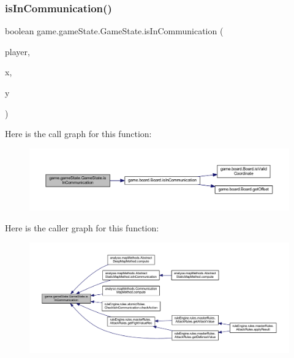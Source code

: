 \subsubsection{\texorpdfstring{is\+In\+Communication()}{isInCommunication()}}
{\footnotesize\ttfamily boolean game.\+game\+State.\+Game\+State.\+is\+In\+Communication (\begin{DoxyParamCaption}\item[{\mbox{\hyperlink{enumgame_1_1_e_player}{E\+Player}}}]{player,  }\item[{int}]{x,  }\item[{int}]{y }\end{DoxyParamCaption})\hspace{0.3cm}{\ttfamily [inline]}}

Here is the call graph for this function\+:
\nopagebreak
\begin{figure}[H]
\begin{center}
\leavevmode
\includegraphics[width=350pt]{classgame_1_1game_state_1_1_game_state_a8e23f889d162d3d43d9d8d24d3525bbd_cgraph}
\end{center}
\end{figure}
Here is the caller graph for this function\+:
\nopagebreak
\begin{figure}[H]
\begin{center}
\leavevmode
\includegraphics[width=350pt]{classgame_1_1game_state_1_1_game_state_a8e23f889d162d3d43d9d8d24d3525bbd_icgraph}
\end{center}
\end{figure}
\mbox{\label{classgame_1_1game_state_1_1_game_state_abfb97afaa4914330a9df6db34e0ae323}} 
